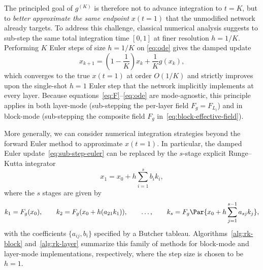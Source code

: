 The principled goal of $g^{(K)}$ is therefore not to advance integration to $t{=}K$, but to \emph{better approximate the same endpoint} $x(t{=}1)$ that the unmodified network already targets. To address this challenge, classical numerical analysis suggests to sub-step the same total integration time $[0,1]$ at finer resolution $h = 1/K$. Performing $K$ Euler steps of size $h{=}1/K$ on \eqref{eq:ode} gives the damped update
\begin{equation}
x_{k+1}=\left(1-\frac{1}{K}\right)x_k+\frac{1}{K}g(x_k),
\label{eq:sub-step-euler}
\end{equation}
which converges to the true $x(t{=}1)$ at order $O(1/K)$ and strictly improves upon the single-shot $h{=}1$ Euler step that the network implicitly implements at every layer. Because equations~\eqref{eq:F}--\eqref{eq:ode} are mode-agnostic, this principle applies in both layer-mode (sub-stepping the per-layer field $F_g = F_{L_i}$) and in block-mode (sub-stepping the composite field $F_g$ in~\eqref{eq:block-effective-field}).

More generally, we can consider numerical integration strategies beyond the forward Euler method to approximate $x(t{=}1)$. In particular, the damped Euler update~\eqref{eq:sub-step-euler} can be replaced by the $s$-stage explicit Runge--Kutta integrator
\begin{equation}
x_1 = x_0 + h\sum_{i=1}^{s} b_i k_i,
\label{eq:rk-update}
\end{equation}
where the $s$ stages are given by
\begin{equation}
k_1 = F_g(x_0),\qquad k_2 = F_g(x_0 + h (a_{21} k_1)),\qquad\dots,\qquad k_s = F_g\Par{x_0 + h\sum_{j=1}^{s-1} a_{sj}k_j},
\label{eq:rk-stages}
\end{equation}
with the coefficients $\{a_{ij}, b_i\}$ specified by a Butcher tableau. Algorithms~\ref{alg:rk-block} and~\ref{alg:rk-layer} summarize this family of methods for block-mode and layer-mode implementations, respectively, where the step size is chosen to be $h{=}1$.



